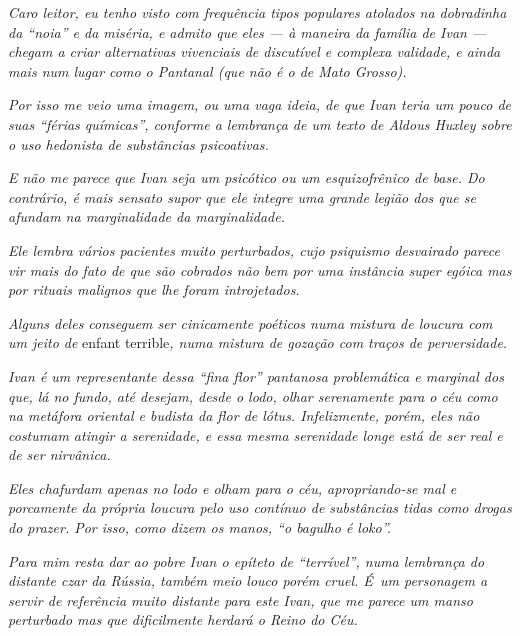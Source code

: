 \emph{Caro leitor, eu tenho visto com frequência tipos populares
atolados na dobradinha da ``noia'' e da miséria, e admito que eles --- à
maneira da família de Ivan --- chegam a criar alternativas vivenciais de
discutível e complexa validade, e ainda mais num lugar como o Pantanal
(que não é o de Mato Grosso).}

\emph{Por isso me veio uma imagem, ou uma vaga ideia, de que Ivan teria
um pouco de suas ``férias químicas'', conforme a lembrança de um texto
de Aldous Huxley sobre o uso hedonista de substâncias psicoativas.}

\emph{E não me parece que Ivan seja um psicótico ou um esquizofrênico de
base. Do contrário, é mais sensato supor que ele integre uma grande
legião dos que se afundam na marginalidade da marginalidade.}

\emph{Ele lembra vários pacientes muito perturbados, cujo psiquismo
desvairado parece vir mais do fato de que são cobrados não bem por uma
instância super egóica mas por rituais malignos que lhe foram
introjetados.}

\emph{Alguns deles conseguem ser cinicamente poéticos numa mistura de
loucura com um jeito de} enfant terrible\emph{, numa mistura de gozação com
traços de perversidade.}

\emph{Ivan é um representante dessa ``fina flor'' pantanosa problemática
e marginal dos que, lá no fundo, até desejam, desde o lodo, olhar
serenamente para o céu como na metáfora oriental e budista da flor de
lótus. Infelizmente, porém, eles não costumam atingir a serenidade, e
essa mesma serenidade longe está de ser real e de ser nirvânica.}

\emph{Eles chafurdam apenas no lodo e olham para o céu, apropriando-se
mal e porcamente da própria loucura pelo uso contínuo de substâncias
tidas como drogas do prazer. Por isso, como dizem os manos, ``o bagulho
é loko''.}

\emph{Para mim resta dar ao pobre Ivan o epíteto de ``terrível'', numa
lembrança do distante czar da Rússia, também meio louco porém cruel. É~um personagem a servir de referência muito distante para este Ivan, que me
parece um manso perturbado mas que dificilmente herdará o Reino do Céu.}
\endgroup